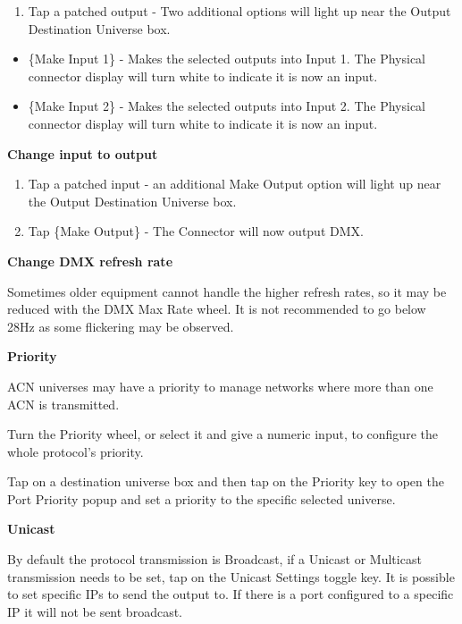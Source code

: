 \documentclass[
]{article}
\providecommand{\tightlist}{%
  \setlength{\itemsep}{0pt}\setlength{\parskip}{0pt}}
\begin{document}
\begin{enumerate}
\def\labelenumi{\arabic{enumi}.}
\tightlist
\item
  Tap a patched output - Two additional options will light up near the Output Destination Universe box.
\end{enumerate}

\begin{itemize}
\item
  \{Make Input 1\} - Makes the selected outputs into Input 1. The Physical connector display will turn white to indicate it is now an input.
\item
  \{Make Input 2\} - Makes the selected outputs into Input 2. The Physical connector display will turn white to indicate it is now an input.
\end{itemize}

\textbf{Change input to output}

\begin{enumerate}
\def\labelenumi{\arabic{enumi}.}
\item
  Tap a patched input - an additional Make Output option will light up near the Output Destination Universe box.
\item
  Tap \{Make Output\} - The Connector will now output DMX.
\end{enumerate}

\textbf{Change DMX refresh rate}

Sometimes older equipment cannot handle the higher refresh rates, so it may be reduced with the DMX Max Rate wheel. It is not recommended to go below 28Hz as some flickering may be observed.

\textbf{Priority}

ACN universes may have a priority to manage networks where more than one ACN is transmitted.

Turn the Priority wheel, or select it and give a numeric input, to configure the whole protocol's priority.

Tap on a destination universe box and then tap on the Priority key to open the Port Priority popup and set a priority to the specific selected universe.

\textbf{Unicast}

By default the protocol transmission is Broadcast, if a Unicast or Multicast transmission needs to be set, tap on the Unicast Settings toggle key. It is possible to set specific IPs to send the output to. If there is a port configured to a specific IP it will not be sent broadcast.
\end{document}
